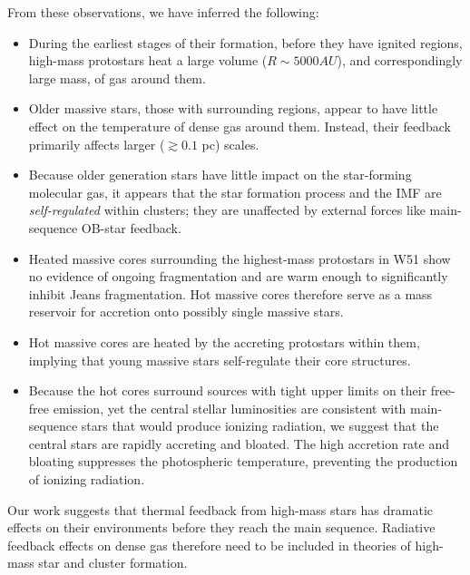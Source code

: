 \documentclass{emulateapj}
\begin{document}
From these observations, we have inferred the following: 
\begin{itemize}
    \item During the earliest stages of their formation, before they have 
        ignited \hii regions, high-mass protostars heat a large volume
        ($R\sim5000 AU$), and correspondingly large mass, of gas around them.
    \item Older massive stars, those with surrounding \hii regions, appear
        to have little effect on the temperature of dense gas around them.
        Instead, their feedback primarily affects larger ($\gtrsim 0.1$ pc)
        scales.
    \item Because older generation stars have little impact on the star-forming
        molecular gas, it appears that the star formation process and the IMF
        are \emph{self-regulated} within clusters; they are unaffected by
        external forces like main-sequence OB-star feedback.
    \item Heated massive cores surrounding the highest-mass protostars in
        W51 show no evidence of ongoing fragmentation and are warm enough
        to significantly inhibit Jeans fragmentation.  Hot massive cores
        therefore serve as a mass reservoir for accretion onto possibly single
        massive stars.
    \item Hot massive cores are heated by the accreting protostars within them,
        implying that young massive stars self-regulate their core structures.
    \item Because the hot cores surround sources with tight upper limits
        on their free-free emission, yet the central stellar luminosities
        are consistent with main-sequence stars that would produce ionizing
        radiation, we suggest that the central stars are rapidly accreting and
        bloated.  The high accretion rate and bloating suppresses the
        photospheric temperature, preventing the production of ionizing
        radiation.
\end{itemize}

Our work suggests that thermal feedback from high-mass stars has dramatic
effects on their environments before they reach the main sequence.  Radiative
feedback effects on dense gas therefore need to be included in theories of
high-mass star and cluster formation.
\end{document}
